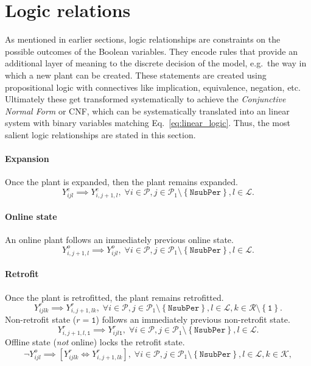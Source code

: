 \documentclass{amsart}
\begin{document}
\section{Logic relations}\label{sec:logic_relations}
%
As mentioned in earlier sections, logic relationships are constraints on the
possible outcomes of the Boolean variables. They encode rules
that provide an additional layer of meaning to the discrete decision of the
model, e.g.\ the way in which a new plant can be created. 
These statements are created using propositional logic with connectives like
implication, equivalence, negation, etc. Ultimately these get transformed
systematically to achieve the \emph{Conjunctive Normal Form} or CNF, which can
be systematically translated into an linear system with binary variables
matching Eq.~\eqref{eq:linear_logic}.
%
Thus, the most salient logic relationships are stated in this section. 
%
\paragraph{Expansion}
%
Once the plant is expanded, then the plant remains expanded.
%
\begin{equation}
    Y^e_{ijl} \implies Y^e_{i, j+1, l}, \; \forall 
    i \in \mathcal{P},
    j \in \mathcal{P}_1 \setminus \left\{\mathtt{NsubPer}\right\},
    l\in \mathcal{L}.
\end{equation}
%
\paragraph{Online state}
An online plant follows an immediately previous online state.
%
\begin{equation}
    Y^o_{i,j+1,l} \implies Y^o_{ijl}, \; \forall 
    i \in \mathcal{P},
    j \in \mathcal{P}_1 \setminus \left\{\mathtt{NsubPer}\right\},
    l\in \mathcal{L}.
\end{equation}
%
\paragraph{Retrofit}
%
Once the plant is retrofitted, the plant remains retrofitted.
%
\begin{equation}
    Y^r_{ijlk} \implies Y^r_{i, j+1, lk}, \; \forall 
    i \in \mathcal{P},
    j \in \mathcal{P}_1 \setminus \left\{\mathtt{NsubPer}\right\},
    l\in \mathcal{L},
    k\in \mathcal{R} \setminus \left\{\mathtt{1}\right\}.
\end{equation}
%
Non-retrofit state ($r=\mathtt{1}$) follows an immediately previous non-retrofit
state.
%
\begin{equation}
    Y^r_{i, j+1, l,\mathtt{1}} \implies Y^r_{ijl\mathtt{1}} , \; \forall 
    i \in \mathcal{P},
    j \in \mathcal{P}_1 \setminus \left\{\mathtt{NsubPer}\right\},
    l\in \mathcal{L}.
\end{equation}
%
Offline state (\emph{not} online) locks the retrofit state.
%
\begin{equation}
    \neg Y^o_{ijl} \implies \left[Y^r_{ijlk} \iff Y^r_{i,j+1,lk}\right]
    , \; \forall
    i \in \mathcal{P},
    j \in \mathcal{P}_1 \setminus \left\{\mathtt{NsubPer}\right\},
    l \in \mathcal{L},
    k \in \mathcal{K},
\end{equation}
%
\end{document}
